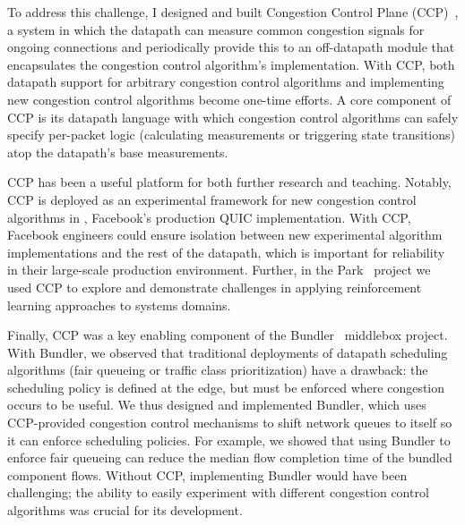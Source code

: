 To address this challenge, I designed and built Congestion Control Plane (CCP)~\cite{ccp-hotnets, ccp}, a system in which the datapath can measure common congestion signals for ongoing connections and periodically provide this to an off-datapath module that encapsulates the congestion control algorithm's implementation. With CCP, both datapath support for arbitrary congestion control algorithms and implementing new congestion control algorithms become one-time efforts.
A core component of CCP is its datapath language with which congestion control algorithms can safely specify per-packet logic (\eg calculating measurements or triggering state transitions) atop the datapath's base measurements.

CCP has been a useful platform for both further research and teaching.
Notably, CCP is deployed as an experimental framework for new congestion control algorithms in , Facebook's production QUIC implementation. With CCP, Facebook engineers could ensure isolation between new experimental algorithm implementations and the rest of the datapath, which is important for reliability in their large-scale production environment.
Further, in the Park~\cite{park} project we used CCP to explore and demonstrate challenges in applying reinforcement learning approaches to systems domains. 

Finally, CCP was a key enabling component of the Bundler~\cite{bundler} middlebox project. With Bundler, we observed that traditional deployments of datapath scheduling algorithms (\eg fair queueing or traffic class prioritization) have a drawback: the scheduling policy is defined at the edge, but must be enforced where congestion occurs to be useful.
We thus designed and implemented Bundler, which uses CCP-provided congestion control mechanisms to shift network queues to itself so it can enforce scheduling policies. For example, we showed that using Bundler to enforce fair queueing can reduce the median flow completion time of the bundled component flows. 
Without CCP, implementing Bundler would have been challenging; the ability to easily experiment with different congestion control algorithms was crucial for its development.
